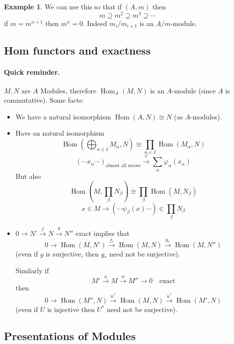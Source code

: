 \documentclass[11pt,a4paper]{article}
\theoremstyle{definition}
\newtheorem{example}[definition]{Example}
\theoremstyle{plain}
\theoremstyle{remark}
\begin{document}
\begin{example}
    We can use this so that if $(A, m)$ then 
    $$m \supseteq m^2 \supseteq m^3 \supseteq \cdots$$
    if $m = m^{n+1}$ then $m^n = 0$. Indeed $m_i / m_{i+1}$ is an $A / m$-module.
\end{example}

\subsection{Hom functors and exactness} 

\paragraph{Quick reminder.}
$M, N$ are $A$ Modules, therefore $\operatorname{Hom}_A (M, N)$ is an $A$-module (since $A$ is commutative). Some facts: 
\begin{itemize}
    \item We have a natural isomorphism $\operatorname{Hom} (A, N) \cong N$ (as $A$-modules). 
    \item Have an natural isomorphism 
    $$\operatorname{Hom} \left( \bigoplus_{\alpha \in I} M_\alpha, N\right) \cong \prod_{\alpha \in I} \operatorname{Hom} (M_\alpha, N)$$
    $$(\cdots x_\alpha \cdots)_{\text{almost all zeroes}} \xrightarrow{\varphi} \sum_\alpha \varphi_\alpha (x_\alpha)$$
    But also 
    $$\operatorname{Hom} (M, \prod_{\beta} N_\beta) \cong \prod_\beta \operatorname{Hom} (M, N_\beta)$$
    $$x \in M \to (\cdots \psi_\beta (x) \cdots ) \in \prod_\beta N_\beta$$

    \item $0 \to N' \xrightarrow{f} N \xrightarrow{g} N''$ exact implies that 
    $$0 \to \operatorname{Hom} (M, N') \xrightarrow{f_*} \operatorname{Hom} (M, N) \xrightarrow{g_*} \operatorname{Hom} (M, N'')$$
    (even if $g$ is surjective, then $g_*$ need not be surjective). 

    Similarly if 
    $$M' \xrightarrow{u} M \xrightarrow{w} M'' \to 0 \quad \text{exact}$$
    then 
    $$0 \to \operatorname{Hom} (M'', N) \xrightarrow{w^*} \operatorname{Hom} (M, N) \xrightarrow{u^*} \operatorname{Hom} (M', N)$$
    (even if $U$ is injective then $U^*$ need not be surjective).
\end{itemize}
\subsection{Presentations of Modules}
\end{document}
